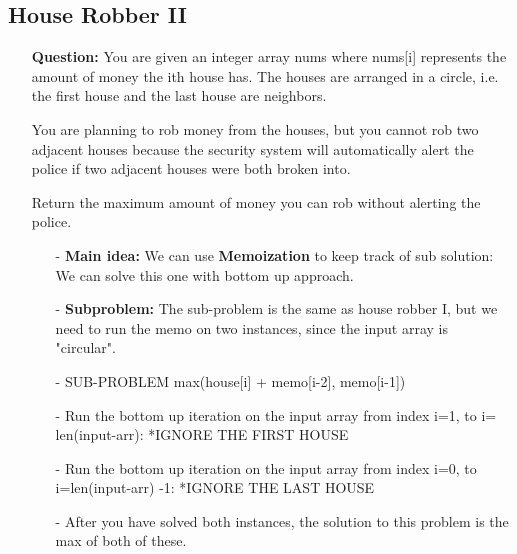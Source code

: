 \documentclass[12pt]{article}
\begin{document}
\subsection{House Robber II}
\begin{enumerate}
  \item[] \textbf{Question:} You are given an integer array nums where nums[i] represents the amount of money the ith house has. The houses are arranged in a circle, i.e. the first house and the last house are neighbors.

You are planning to rob money from the houses, but you cannot rob two adjacent houses because the security system will automatically alert the police if two adjacent houses were both broken into.

Return the maximum amount of money you can rob without alerting the police.


    \begin{enumerate}
      \item[-] \textbf{Main idea:} We can use \textbf{Memoization} to keep track of sub solution: We can solve this one with bottom up approach.
      \item[-] \textbf{Subproblem:} The sub-problem is the same as house robber I, but we need to run the memo on two instances, since the input array is "circular".
      \item[-] SUB-PROBLEM max(house[i] + memo[i-2], memo[i-1])
      \item[-] Run the bottom up iteration on the input array from index i=1, to i= len(input-arr): *IGNORE THE FIRST HOUSE
      \item[-] Run the bottom up iteration on the input array from index i=0, to i=len(input-arr) -1: *IGNORE THE LAST HOUSE
      \item[-] After you have solved both instances, the solution to this problem is the max of both of these.
    \end{enumerate}
\end{enumerate}
\end{document}

